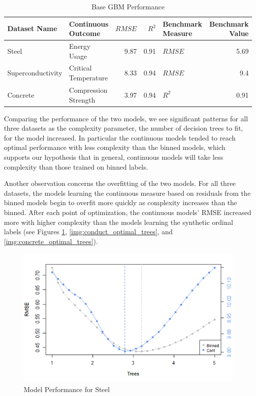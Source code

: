 \documentclass[10pt]{article}\usepackage[]{graphicx}\usepackage[]{xcolor}
\begin{document}
\begin{table}[h!]
  \begin{center}
    \caption{Base GBM Performance}
    \label{tab:base_perf}
    \begin{tabular}{l|l|r|r|l|r}
      \textbf{Dataset Name} & \textbf{Continuous Outcome} & $RMSE$ & $R^2$ & \textbf{Benchmark Measure} & \textbf{Benchmark Value}\\
      \hline
      Steel& Energy Usage & 9.87 & 0.91 & $RMSE$ & 5.69 \\
      Superconductivity & Critical Temperature & 8.33 & 0.94 & $RMSE$ & 9.4  \\
      Concrete & Compression Strength & 3.97 & 0.94 & $R^2$ & 0.91 \\
    \end{tabular}
  \end{center}
\end{table}


Comparing the performance of the two models, we see significant patterns for all three datasets as the complexity parameter, the number of decision trees to fit, for the model increased. In particular the continuous models tended to reach optimal performance with less complexity than the binned models, which supports our hypothesis that in general, continuous models will take less complexity than those trained on binned labels.

Another observation concerns the overfitting of the two models. For all three datasets, the models learning the continuous measure based on residuals from the binned models begin to overfit more quickly as complexity increases than the binned. After each point of optimization, the continuous models' RMSE increased more with higher complexity than the models learning the synthetic ordinal labels (see Figures \ref{img:steel_optimal_trees}, \ref{img:conduct_optimal_trees}, and \ref{img:concrete_optimal_trees}).


\begin{figure}[htp]
  \centering
  \includegraphics[scale=0.8]{effects_of_complexity/final_steel_complexity_with_max.png}
  \caption{Model Performance for Steel}
  \label{img:steel_optimal_trees}
\end{figure}
\end{document}

